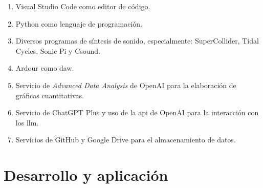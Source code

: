 \begin{enumerate}
    \item Visual Studio Code como editor de código.
    \item Python como lenguaje de programación.
    \item Diversos programas de síntesis de sonido, especialmente: SuperCollider, Tidal Cycles, Sonic Pi y Csound.
    \item {Ardour} como \gls{daw}.
    \item Servicio de \emph{Advanced Data Analysis} de OpenAI para la elaboración de gráficas cuantitativas.
    \item Servicio de ChatGPT Plus y uso de la \gls{api} de OpenAI para la interacción con los \gls{llm}.
    \item Servicios de GitHub y Google Drive para el almacenamiento de datos.
\end{enumerate}


\section{Desarrollo y aplicación}

